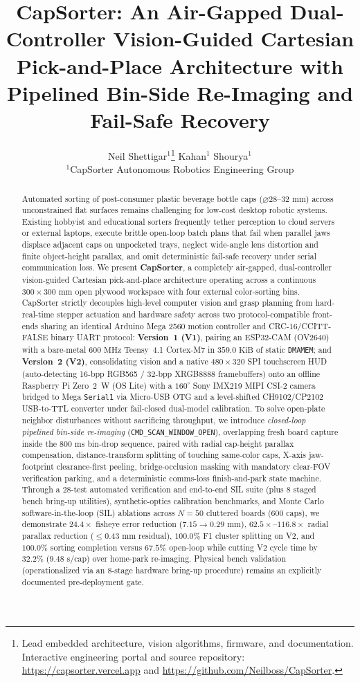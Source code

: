\documentclass[10pt,twocolumn,letterpaper]{article}
\title{CapSorter: An Air-Gapped Dual-Controller Vision-Guided Cartesian Pick-and-Place Architecture with Pipelined Bin-Side Re-Imaging and Fail-Safe Recovery}
\author{
Neil Shettigar$^{1}$\thanks{Lead embedded architecture, vision algorithms, firmware, and documentation. Interactive engineering portal and source repository: \url{https://capsorter.vercel.app} and \url{https://github.com/Neilboss/CapSorter}.} \qquad
Kahan$^{1}$ \qquad
Shourya$^{1}$\\[4pt]
$^{1}$CapSorter Autonomous Robotics Engineering Group
}
\begin{document}
\maketitle

\begin{abstract}
Automated sorting of post-consumer plastic beverage bottle caps ($\varnothing 28\text{--}32\text{ mm}$) across unconstrained flat surfaces remains challenging for low-cost desktop robotic systems. Existing hobbyist and educational sorters frequently tether perception to cloud servers or external laptops, execute brittle open-loop batch plans that fail when parallel jaws displace adjacent caps on unpocketed trays, neglect wide-angle lens distortion and finite object-height parallax, and omit deterministic fail-safe recovery under serial communication loss. We present \textbf{CapSorter}, a completely air-gapped, dual-controller vision-guided Cartesian pick-and-place architecture operating across a continuous $300\times 300\text{ mm}$ open plywood workspace with four external color-sorting bins. CapSorter strictly decouples high-level computer vision and grasp planning from hard-real-time stepper actuation and hardware safety across two protocol-compatible front-ends sharing an identical Arduino Mega 2560 motion controller and CRC-16/CCITT-FALSE binary UART protocol: \textbf{Version~1 (V1)}, pairing an ESP32-CAM (OV2640) with a bare-metal $600\text{ MHz}$ Teensy~4.1 Cortex-M7 in $359.0\text{ KiB}$ of static \texttt{DMAMEM}; and \textbf{Version~2 (V2)}, consolidating vision and a native $480\times 320$ SPI touchscreen HUD (auto-detecting 16-bpp RGB565 / 32-bpp XRGB8888 framebuffers) onto an offline Raspberry Pi Zero~2~W (OS Lite) with a $160^\circ$ Sony IMX219 MIPI CSI-2 camera bridged to Mega \texttt{Serial1} via Micro-USB OTG and a level-shifted CH9102/CP2102 USB-to-TTL converter under fail-closed dual-model calibration. To solve open-plate neighbor disturbances without sacrificing throughput, we introduce \emph{closed-loop pipelined bin-side re-imaging} (\texttt{CMD\_SCAN\_WINDOW\_OPEN}), overlapping fresh board capture inside the $800\text{ ms}$ bin-drop sequence, paired with radial cap-height parallax compensation, distance-transform splitting of touching same-color caps, X-axis jaw-footprint clearance-first peeling, bridge-occlusion masking with mandatory clear-FOV verification parking, and a deterministic comms-loss finish-and-park state machine. Through a 28-test automated verification and end-to-end SIL suite (plus 8 staged bench bring-up utilities), synthetic-optics calibration benchmarks, and Monte Carlo software-in-the-loop (SIL) ablations across $N=50$ cluttered boards ($600$ caps), we demonstrate $24.4\times$ fisheye error reduction ($7.15\to 0.29\text{ mm}$), $62.5\times\text{--}116.8\times$ radial parallax reduction ($\le 0.43\text{ mm}$ residual), $100.0\%$ F1 cluster splitting on V2, and $100.0\%$ sorting completion versus $67.5\%$ open-loop while cutting V2 cycle time by $32.2\%$ ($9.48\text{ s/cap}$) over home-park re-imaging. Physical bench validation (operationalized via an 8-stage hardware bring-up procedure) remains an explicitly documented pre-deployment gate.

\end{abstract}
\end{document}
